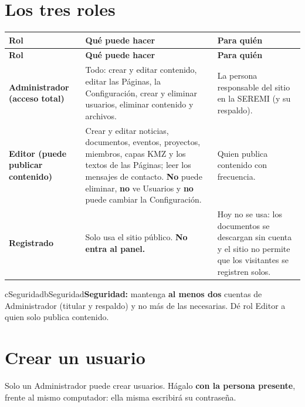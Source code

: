 \documentclass[11pt,letterpaper]{report}
\begin{document}
\section{Los tres roles}
\begin{longtable}{>{\raggedright\arraybackslash}p{}>{\raggedright\arraybackslash}p{}>{\raggedright\arraybackslash}p{}}
\rowcolor{h2vazul}\textbf{\color{white}Rol} & \textbf{\color{white}Qué puede hacer} & \textbf{\color{white}Para quién} \\
\endfirsthead
\rowcolor{h2vazul}\textbf{\color{white}Rol} & \textbf{\color{white}Qué puede hacer} & \textbf{\color{white}Para quién} \\
\endhead
\textbf{Administrador (acceso total)} & Todo: crear y editar contenido, editar las Páginas, la Configuración, crear y eliminar usuarios, eliminar contenido y archivos. & La persona responsable del sitio en la SEREMI (y su respaldo). \\ \midrule
\rowcolor{filaalt}\textbf{Editor (puede publicar contenido)} & Crear y editar noticias, documentos, eventos, proyectos, miembros, capas KMZ y los textos de las Páginas; leer los mensajes de contacto. \textbf{No} puede eliminar, \textbf{no} ve Usuarios y \textbf{no} puede cambiar la Configuración. & Quien publica contenido con frecuencia. \\ \midrule
\textbf{Registrado} & Solo usa el sitio público. \textbf{No entra al panel.} & Hoy no se usa: los documentos se descargan sin cuenta y el sitio no permite que los visitantes se registren solos. \\ \bottomrule
\end{longtable}
\begin{recuadro}{cSeguridad}{bSeguridad}\textbf{\color{bSeguridad}Seguridad:} mantenga \textbf{al menos dos} cuentas de Administrador (titular y respaldo) y no más de las necesarias. Dé rol Editor a quien solo publica contenido.\end{recuadro}
\section{Crear un usuario}
Solo un Administrador puede crear usuarios. Hágalo \textbf{con la persona presente}, frente al mismo computador: ella misma escribirá su contraseña.
\end{document}
